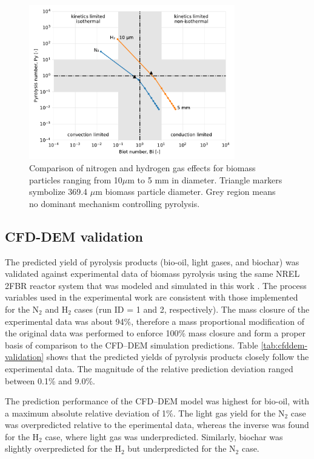 \documentclass{article}
\begin{document}
\begin{figure}[H]
    \centering
    \includegraphics[width=0.8\textwidth]{figures/biot-pyro-diams.pdf}
    \caption{Comparison of nitrogen and hydrogen gas effects for biomass particles ranging from 10$\mu$m to 5 mm in diameter. Triangle markers symbolize 369.4 $\mu$m biomass particle diameter. Grey region means no dominant mechanism controlling pyrolysis.}
    \label{fig:biot-pyro-diams}
\end{figure}

\subsection{CFD-DEM validation}

The predicted yield of pyrolysis products (bio-oil, light gases, and biochar) was validated against experimental data of biomass pyrolysis using the same NREL 2FBR reactor system that was modeled and simulated in this work \cite{French-2021}. The process variables used in the experimental work are consistent with those implemented for the N$_2$ and H$_2$ cases (run ID = 1 and 2, respectively). The mass closure of the experimental data was about 94\%, therefore a mass proportional modification of the original data was performed to enforce 100\% mass closure and form a proper basis of comparison to the CFD--DEM simulation predictions. Table \ref{tab:cfddem-validation} shows that the predicted yields of pyrolysis products closely follow the experimental data. The magnitude of the relative prediction deviation ranged between 0.1\% and 9.0\%.

The prediction performance of the CFD--DEM model was highest for bio-oil, with a maximum absolute relative deviation of 1\%. The light gas yield for the N$_2$ case was overpredicted relative to the eperimental data, whereas the inverse was found for the H$_2$ case, where light gas was underpredicted. Similarly, biochar was slightly overpredicted for the H$_2$ but underpredicted for the N$_2$ case.
\end{document}
